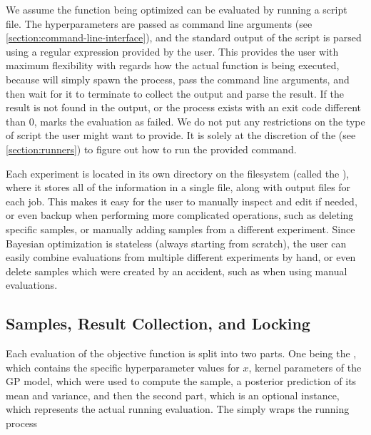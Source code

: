 We assume the function being optimized can be evaluated by running a script file. The hyperparameters are passed as command line arguments (see \autoref{section:command-line-interface}), and the standard output of the script is parsed using a regular expression provided by the user. This provides the user with maximum flexibility with regards how the actual function is being executed, because \bopt will simply spawn the process, pass the command line arguments, and then wait for it to terminate to collect the output and parse the result. If the result is not found in the output, or the process exists with an exit code different than $0$, \bopt marks the evaluation as failed. We do not put any restrictions on the type of script the user might want to provide. It is solely at the discretion of the  (see \autoref{section:runners}) to figure out how to run the provided command.

Each \bopt experiment is located in its own directory on the filesystem (called the ), where it stores all of the information in a single  file, along with output files for each job. This makes it easy for the user to manually inspect and edit if needed, or even backup when performing more complicated operations, such as deleting specific samples, or manually adding samples from a different experiment. Since Bayesian optimization is stateless (always starting from scratch), the user can easily combine evaluations from multiple different experiments by hand, or even delete samples which were created by an accident, such as when using manual evaluations.


\subsection{Samples, Result Collection, and Locking}

Each evaluation of the objective function is split into two parts. One being the , which contains the specific hyperparameter values for $x$, kernel parameters of the GP model, which were used to compute the sample, a posterior prediction of its mean and variance, and then the second part, which is an optional  instance, which represents the actual running evaluation. The  simply wraps the running process 

